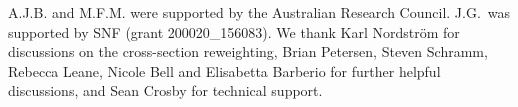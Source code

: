 A.J.B. and M.F.M. were supported by the Australian Research Council. J.G.~was supported by SNF (grant 200020\_156083). We thank Karl Nordstr{\"o}m for discussions on the cross-section reweighting, Brian Petersen, Steven Schramm, Rebecca Leane, Nicole Bell and Elisabetta Barberio for further helpful discussions, and Sean Crosby for technical support.
